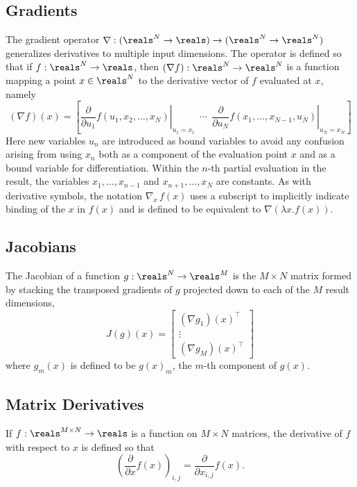\documentclass[10pt]{article}
\begin{document}
\subsection{Gradients}

The gradient operator $\nabla:(\reals^N \rightarrow \reals)\rightarrow
(\reals^N \rightarrow \reals^N)$ generalizes derivatives to multiple
input dimensions.  The operator is defined so that if
$f : \reals^N \rightarrow \reals$, then $(\nabla f):\reals^N \rightarrow
\reals^N$ is a function mapping a point $x \in \reals^N$ to the
derivative vector of $f$ evaluated at $x$, namely
%
\[
(\nabla f)(x) 
= 
\left[
  \left. 
    \frac{\partial}{\partial u_1} f(u_1,x_2,\ldots,x_N)
  \right|_{u_1 = x_1}
  \ \ \cdots \ \ 
  \left. 
    \frac{\partial}{\partial u_N}  f(x_1,\ldots,x_{N-1},u_N)
   \right|_{u_N = x_N}
\right]
\]
%
Here new variables $u_n$ are introduced as bound variables to avoid
any confusion arising from using $x_n$ both as a component of the
evaluation point $x$ and as a bound variable for differentiation.
Within the $n$-th partial evaluation in the result, the variables
$x_1,\ldots,x_{n-1}$ and $x_{n+1},\ldots,x_N$ are constants.  As with
derivative symbols, the notation $\nabla_{\!x} \, f(x)$ uses a
subscript to implicitly indicate binding of the $x$ in $f(x)$ and is
defined to be equivalent to $\nabla(\lambda x. f(x))$.

\subsection{Jacobians}

The Jacobian of a function $g : \reals^N \rightarrow \reals^M$ is 
the $M \times N$ matrix formed by stacking the transposed gradients of $g$ projected down to
each of the $M$ result dimensions,
%
\[
J(g)(x) = 
\left[
\begin{array}{c}
(\nabla g_1)(x)^{\top}
\\[2pt]
\vdots
\\[2pt]
(\nabla g_M)(x)^{\top}
\end{array}
\right]
\]
%
where $g_m(x)$ is defined to be $g(x)_m$, the $m$-th component of $g(x)$.


\subsection{Matrix Derivatives}

If $f:\reals^{M \times N} \rightarrow \reals$ is a function on $M
\times N$ matrices, the derivative of $f$ with respect to $x$ is
defined so that 
\[
\left( \frac{\partial}{\partial x} f(x) \right)_{i,j}
=
\frac{\partial}{\partial x_{i,j}} f(x).
\]
\end{document}
